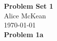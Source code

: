 \documentclass{article}
\newcommand{\problem}[1]{\large\textbf{Problem #1}\normalsize}
\begin{document}
\noindent\Large\textbf{Problem Set 1} \\
\normalsize
Alice McKean \\
\today \\

\problem{1a}
\end{document}
